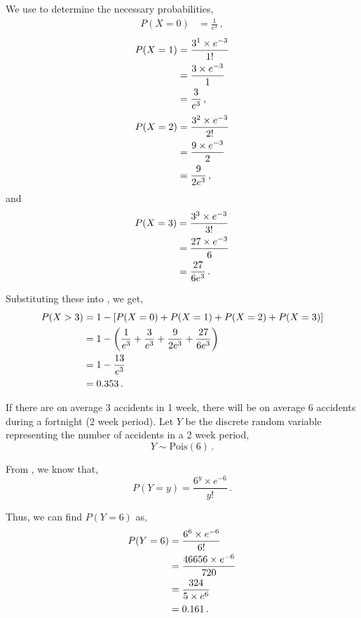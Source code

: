 \begin{subquestions}
\begin{subsubquestions}
We use  to determine the necessary probabilities, 
\begin{align}
	P(X=0) & = \frac{1}{e^3} \,,
\end{align}
\begin{align}
	P(X=1) & = \frac{ 3^1 \times e^{-3}}{1!} \nonumber \\
	       & = \frac{3 \times e^{-3}}{1} \nonumber \\
	       & = \frac{3}{e^3} \,,
\end{align}
\begin{align}
	P(X=2) & = \frac{ 3^2 \times e^{-3}}{2!} \nonumber \\
	       & = \frac{9 \times e^{-3}}{2} \nonumber \\
	       & = \frac{9}{2e^3} \,,
\end{align}
and
\begin{align}
	P(X=3) & = \frac{ 3^3 \times e^{-3}}{3!} \nonumber \\
	       & = \frac{27 \times e^{-3}}{6} \nonumber \\
	       & = \frac{27}{6e^3} \,. 
\end{align}

Substituting these into , we get,
\begin{align}
	P(X>3) & = 1 - [P(X=0)+P(X=1)+P(X=2)+P(X=3)] \nonumber \\
			 & = 1 - \left(\frac{1}{e^3} + \frac{3}{e^3} + \frac{9}{2e^3} + \frac{27}{6e^3} \right) \nonumber \\
		    & = 1 - \frac{13}{e^3} \nonumber \\
			 & = 0.353 \,.
\end{align}

\subsubquestion

If there are on average 3 accidents in 1 week, there will be on average 6 accidents during a fortnight (2 week period). Let $Y$ be the discrete random variable representing the number of accidents in a 2 week period,
\begin{equation}
	Y \sim \text{Pois}(6) \,.
\end{equation} 

From , we know that,
\begin{equation}
	P(Y = y) =\frac{ 6 ^ y \times e^{-6}}{y!} \,.
\end{equation}

Thus, we can find $P(Y=6)$ as,
\begin{align}
	P(Y = 6) & = \frac{ 6 ^ 6 \times e^{-6}}{6!} \nonumber \\	
	         & = \frac{46656 \times e^{-6}}{720} \nonumber \\
	         & = \frac{324}{5 \times e^6} \nonumber \\
	         & = 0.161 \,.
\end{align}


\end{subsubquestions}
\end{subquestions}
